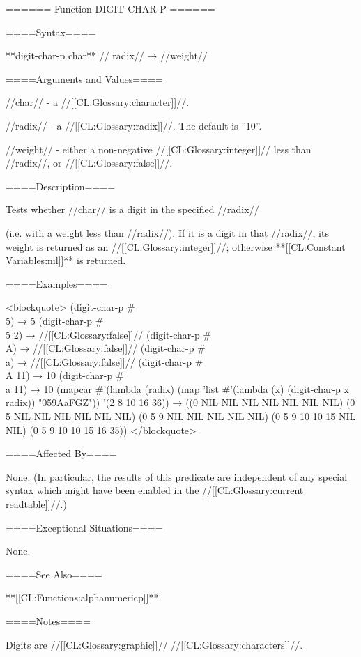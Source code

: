 ====== Function DIGIT-CHAR-P ======

====Syntax====

**digit-char-p {char** //\opt} radix// → //weight//

====Arguments and Values====

//char// - a //[[CL:Glossary:character]]//.

//radix// - a //[[CL:Glossary:radix]]//. The default is ''10''.

//weight// - either a non-negative //[[CL:Glossary:integer]]// less than //radix//, or //[[CL:Glossary:false]]//.

====Description====

Tests whether //char// is a digit in the specified //radix//

(i.e. with a weight less than //radix//). If it is a digit in that //radix//, its weight is returned as an //[[CL:Glossary:integer]]//; otherwise **[[CL:Constant Variables:nil]]** is returned.

====Examples====

<blockquote> (digit-char-p #\\5) → 5 (digit-char-p #\\5 2) → //[[CL:Glossary:false]]// (digit-char-p #\\A) → //[[CL:Glossary:false]]// (digit-char-p #\\a) → //[[CL:Glossary:false]]// (digit-char-p #\\A 11) → 10 (digit-char-p #\\a 11) → 10 (mapcar #'(lambda (radix) (map 'list #'(lambda (x) (digit-char-p x radix)) "059AaFGZ")) '(2 8 10 16 36)) → ((0 NIL NIL NIL NIL NIL NIL NIL) (0 5 NIL NIL NIL NIL NIL NIL) (0 5 9 NIL NIL NIL NIL NIL) (0 5 9 10 10 15 NIL NIL) (0 5 9 10 10 15 16 35)) </blockquote>

====Affected By====

None. (In particular, the results of this predicate are independent of any special syntax which might have been enabled in the //[[CL:Glossary:current readtable]]//.)

====Exceptional Situations====

None.

====See Also====

**[[CL:Functions:alphanumericp]]**

====Notes====

Digits are //[[CL:Glossary:graphic]]// //[[CL:Glossary:characters]]//.

